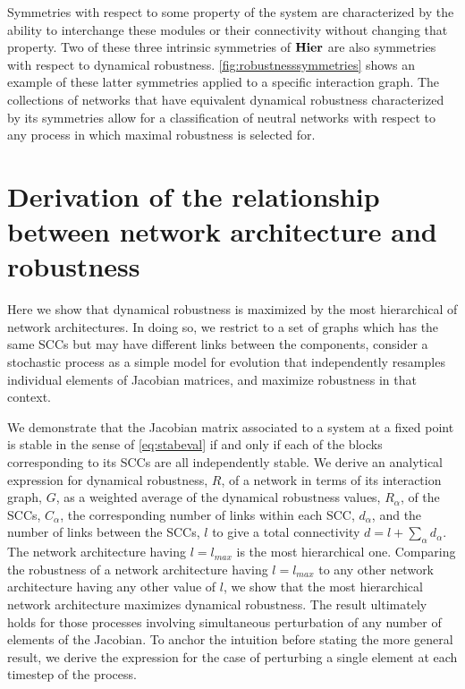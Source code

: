 Symmetries with respect to some property of the system are characterized by the ability to interchange these modules or their connectivity without changing that property. Two of these three intrinsic symmetries of $\mathbf{Hier}$ are also symmetries with respect to dynamical robustness. \ref{fig:robustnesssymmetries} shows an example of these latter symmetries applied to a specific interaction graph. The collections of networks that have equivalent dynamical robustness characterized by its symmetries allow for a classification of neutral networks with respect to any process in which maximal robustness is selected for.

\section{Derivation of the relationship between network architecture and robustness}
Here we show that dynamical robustness is maximized by the most hierarchical of network architectures. In doing so, we restrict to a set of graphs which has the same SCCs but may have different links between the components, consider a stochastic process as a simple model for evolution that independently resamples individual elements of Jacobian matrices, and maximize robustness in that context.

We demonstrate that the Jacobian matrix associated to a system at a fixed point is stable in the sense of \ref{eq:stabeval} if and only if each of the blocks corresponding to its SCCs are all independently stable. We derive an analytical expression for dynamical robustness, $R$, of a network in terms of its interaction graph, $G$, as a weighted average of the dynamical robustness values, $R_{\alpha}$, of the SCCs, $C_{\alpha}$, the corresponding number of links within each SCC, $d_{\alpha}$, and the number of links between the SCCs, $l$ to give a total connectivity $d = l + \sum_{\alpha} d_{\alpha}$. The network architecture having $l=l_{max}$ is the most hierarchical one. Comparing the robustness of a network architecture having $l = l_{max}$ to any other network architecture having any other value of $l$, we show that the most hierarchical network architecture maximizes dynamical robustness. The result ultimately holds for those processes involving simultaneous perturbation of any number of elements of the Jacobian. To anchor the intuition before stating the more general result, we derive the expression for the case of perturbing a single element at each timestep of the process.
